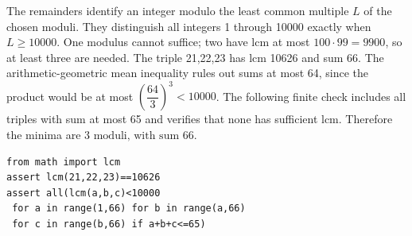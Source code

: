 The remainders identify an integer modulo the least common multiple $ L $ of the chosen moduli. They distinguish all integers 1 through 10000 exactly when $ L\ge10000 $. One modulus cannot suffice; two have lcm at most $ 100\cdot99=9900 $, so at least three are needed. The triple 21,22,23 has lcm 10626 and sum 66. The arithmetic-geometric mean inequality rules out sums at most 64, since the product would be at most $(\dfrac{64}{3})^3<10000 $. The following finite check includes all triples with sum at most 65 and verifies that none has sufficient lcm. Therefore the minima are $\boxed{3\text{ moduli, with sum }66}$.
\begin{verbatim}
from math import lcm
assert lcm(21,22,23)==10626
assert all(lcm(a,b,c)<10000
 for a in range(1,66) for b in range(a,66)
 for c in range(b,66) if a+b+c<=65)
\end{verbatim}
